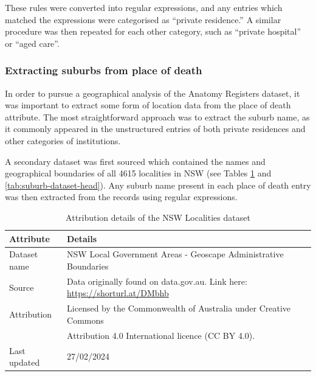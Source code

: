 These rules were converted into regular expressions, and any entries which matched the expressions were categorised as ``private residence.'' A similar procedure was then repeated for each other category, such as ``private hospital'' or ``aged care''.

\subsubsection{Extracting suburbs from place of death}

In order to pursue a geographical analysis of the Anatomy Registers dataset, it was important to extract some form of location data from the place of death attribute. The most straightforward approach was to extract the suburb name, as it commonly appeared in the unstructured entries of both private residences and other categories of institutions.

A secondary dataset was first sourced which contained the names and geographical boundaries of all 4615 localities in NSW (see Tables \ref{tab:suburb-dataset-details} and \ref{tab:suburb-dataset-head}). Any suburb name present in each place of death entry was then extracted from the records using regular expressions.

\begin{table}[htbp]
\centering
\caption{Attribution details of the NSW Localities dataset}
\label{tab:suburb-dataset-details}
\begin{tabular}{@{}ll@{}}
\toprule
\textbf{Attribute}         & \textbf{Details} \\
\midrule
Dataset name               & NSW Local Government Areas - Geoscape Administrative Boundaries \\
Source                     & Data originally found on data.gov.au. Link here: \url{https://shorturl.at/DMbhb}\\
Attribution                & Licensed by the Commonwealth of Australia under Creative Commons \\
                           & Attribution 4.0 International licence (CC BY 4.0). \\
Last updated               & 27/02/2024 \\
\bottomrule
\end{tabular}
\end{table}

